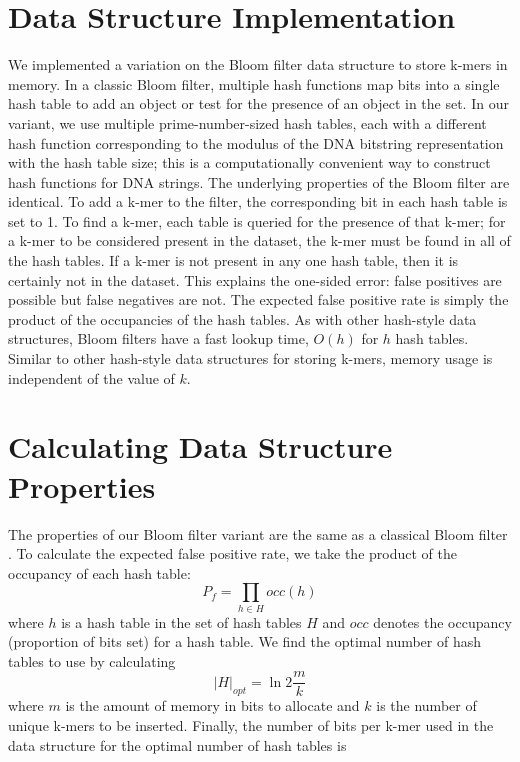 \documentclass{pnastwo}
\begin{document}
\begin{article}
\begin{materials}
\section{Data Structure Implementation}
We implemented a variation on the Bloom filter data structure to store
k-mers in memory. In a classic Bloom filter, multiple hash functions
map bits into a single hash table to add an object or test for the
presence of an object in the set. In our variant, we use multiple
prime-number-sized hash tables, each with a different hash function
corresponding to the modulus of the DNA bitstring representation with
the hash table size; this is a computationally convenient way to
construct hash functions for DNA strings.  The underlying properties
of the Bloom filter are identical.  To add a k-mer to the filter, the
corresponding bit in each hash table is set to 1.  To find a k-mer,
each table is queried for the presence of that k-mer; for a k-mer to
be considered present in the dataset, the k-mer must be found in all
of the hash tables.  If a k-mer is not present in any one hash table,
then it is certainly not in the dataset. This explains the one-sided
error: false positives are possible but false negatives are not. The
expected false positive rate is simply the product of the occupancies
of the hash tables.  As with other hash-style data structures, Bloom
filters have a fast lookup time, $O(h)$ for $h$ hash tables.  Similar
to other hash-style data structures for storing k-mers, memory usage
is independent of the value of $k$.

\section{Calculating Data Structure Properties}
The properties of our Bloom filter variant are the same as a classical
Bloom filter \cite{bloomsurvey}.  To calculate the expected false
positive rate, we take the product of the occupancy of each hash
table:
\begin{displaymath}
P_f = \prod_{h \in H} occ(h)
\end{displaymath}
where $h$ is a hash table in the set of hash tables $H$ and $occ$ denotes
the occupancy (proportion of bits set) for a hash table.
We find the optimal number of hash tables
to use by calculating
\begin{displaymath}
\vert H \vert_{opt} = \ln 2 \frac{m}{k}
\end{displaymath}
where $m$ is the amount of memory in bits to allocate and $k$
is the number of unique k-mers to be inserted. Finally,
the number of bits per
k-mer used in the data structure for the optimal number of hash 
tables is


\end{materials}
\end{article}
\end{document}
